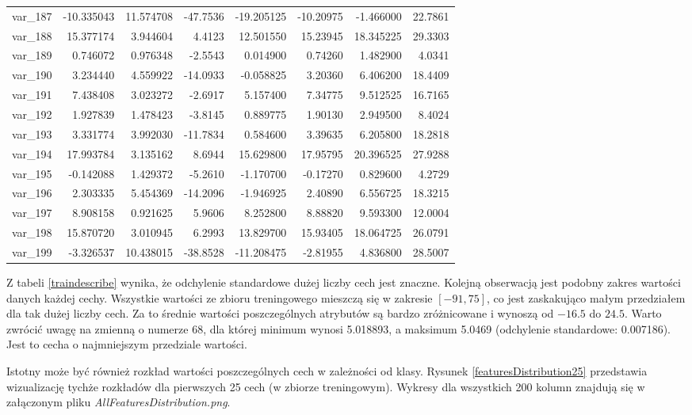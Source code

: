 \documentclass[12pt]{article}
\begin{document}
\begin{longtable}{lrrrrrrr}
 var\_187 & -10.335043 &  11.574708 & -47.7536 & -19.205125 & -10.20975 &  -1.466000 &  22.7861 \\
 var\_188 &  15.377174 &   3.944604 &   4.4123 &  12.501550 &  15.23945 &  18.345225 &  29.3303 \\
 var\_189 &   0.746072 &   0.976348 &  -2.5543 &   0.014900 &   0.74260 &   1.482900 &   4.0341 \\
 var\_190 &   3.234440 &   4.559922 & -14.0933 &  -0.058825 &   3.20360 &   6.406200 &  18.4409 \\
 var\_191 &   7.438408 &   3.023272 &  -2.6917 &   5.157400 &   7.34775 &   9.512525 &  16.7165 \\
 var\_192 &   1.927839 &   1.478423 &  -3.8145 &   0.889775 &   1.90130 &   2.949500 &   8.4024 \\
 var\_193 &   3.331774 &   3.992030 & -11.7834 &   0.584600 &   3.39635 &   6.205800 &  18.2818 \\
 var\_194 &  17.993784 &   3.135162 &   8.6944 &  15.629800 &  17.95795 &  20.396525 &  27.9288 \\
 var\_195 &  -0.142088 &   1.429372 &  -5.2610 &  -1.170700 &  -0.17270 &   0.829600 &   4.2729 \\
 var\_196 &   2.303335 &   5.454369 & -14.2096 &  -1.946925 &   2.40890 &   6.556725 &  18.3215 \\
 var\_197 &   8.908158 &   0.921625 &   5.9606 &   8.252800 &   8.88820 &   9.593300 &  12.0004 \\
 var\_198 &  15.870720 &   3.010945 &   6.2993 &  13.829700 &  15.93405 &  18.064725 &  26.0791 \\
 var\_199 &  -3.326537 &  10.438015 & -38.8528 & -11.208475 &  -2.81955 &   4.836800 &  28.5007 \\
\end{longtable}

Z tabeli \ref{traindescribe} wynika, że odchylenie standardowe dużej liczby cech jest znaczne. Kolejną obserwacją jest podobny zakres wartości danych każdej cechy. Wszystkie wartości ze zbioru treningowego mieszczą się w zakresie $[-91, 75]$, co jest zaskakująco małym przedziałem dla tak dużej liczby cech. Za to średnie wartości poszczególnych atrybutów są bardzo zróżnicowane i wynoszą od $-16.5$ do $24.5$. Warto zwrócić uwagę na zmienną o numerze $68$, dla której minimum wynosi 5.018893, a maksimum 5.0469 (odchylenie standardowe: 0.007186). Jest to cecha o najmniejszym przedziale wartości.
\newline 

Istotny może być również rozkład wartości poszczególnych cech w zależności od klasy.
Rysunek \ref{featuresDistribution25} przedstawia wizualizację tychże rozkładów dla pierwszych 25 cech (w zbiorze treningowym). Wykresy dla wszystkich 200 kolumn znajdują się w załączonym pliku \textit{AllFeaturesDistribution.png}.
\end{document}

